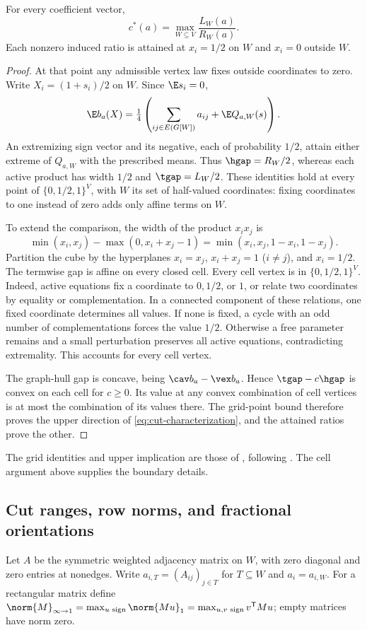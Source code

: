 \begin{lemma}\label{lem:induced-cut}
For every coefficient vector,
\begin{equation}\label{eq:cut-characterization}
 c^*(a)=\max_{W\subseteq V}\frac{L_W(a)}{R_W(a)}.
\end{equation}
Each nonzero induced ratio is attained at $x_i=1/2$ on $W$ and $x_i=0$
outside $W$.
\end{lemma}
\begin{proof}
At that point any admissible vertex law fixes outside coordinates to zero.
Write $X_i=(1+s_i)/2$ on $W$. Since $\E s_i=0$,
\[
 \E b_a(X)=\tfrac14\left(\sum_{ij\in E(G[W])}a_{ij}+\E Q_{a,W}(s)\right).
\]
An extremizing sign vector and its negative, each of probability $1/2$,
attain either extreme of $Q_{a,W}$ with the prescribed means. Thus
$\hgap=R_W/2$, whereas each active product has width $1/2$ and
$\tgap=L_W/2$. These identities hold at every point of
$\{0,1/2,1\}^V$, with $W$ its set of half-valued coordinates: fixing
coordinates to one instead of zero adds only affine terms on $W$.

To extend the comparison, the width of the product $x_ix_j$ is
\[
 \min(x_i,x_j)-\max(0,x_i+x_j-1)
 =\min(x_i,x_j,1-x_i,1-x_j).
\]
Partition the cube by the hyperplanes $x_i=x_j$, $x_i+x_j=1$ ($i\ne j$),
and $x_i=1/2$. The termwise gap is affine on every closed cell.
Every cell vertex is in $\{0,1/2,1\}^V$. Indeed, active equations fix a
coordinate to $0,1/2$, or $1$, or relate two coordinates by equality or
complementation. In a connected component of these relations, one fixed
coordinate determines all values. If none is fixed, a cycle with an odd
number of complementations forces the value $1/2$. Otherwise a free
parameter remains and a small perturbation preserves all active equations,
contradicting extremality. This accounts for every cell vertex.

The graph-hull gap is concave, being $\cav b_a-\vex b_a$. Hence
$\tgap-c\hgap$ is convex on each cell for $c\ge0$. Its value at any
convex combination of cell vertices is at most the combination of its
values there. The grid-point bound therefore proves the upper direction
of \eqref{eq:cut-characterization}, and the attained ratios prove the other.
\end{proof}
The grid identities and upper implication are those of
\citet[Lemma 1 and Corollary 1]{Boland2017}, following
\citet{Luedtke2012}. The cell argument above supplies the boundary details.

\subsection{Cut ranges, row norms, and fractional orientations}
Let $A$ be the symmetric weighted adjacency matrix on $W$, with zero
diagonal and zero entries at nonedges. Write $a_{i,T}=(A_{ij})_{j\in T}$
for $T\subseteq W$ and $a_i=a_{i,W}$. For a rectangular matrix define
$\norm{M}_{\infty\to1}=\max_{u\text{ sign}}\norm{Mu}_1
=\max_{u,v\text{ sign}}v^{\mathsf T}Mu$; empty matrices have norm zero.

